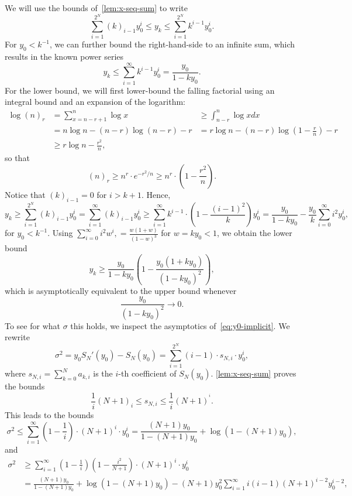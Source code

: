 \documentclass{article}
\begin{document}
\begin{appendixproof}
    We will use the bounds of~\cref{lem:x-seq-sum} to write
    \[
    \sum_{i=1}^{2^N}(k)_{i-1}y_0^i\le y_k\le \sum_{i=1}^{2^N}k^{i-1}y_0^i.
    \]
    For $y_0<k^{-1}$, we can further bound the right-hand-side to an infinite sum, which results in the known power series
    \[
    y_k\le \sum_{i=1}^{\infty}k^{i-1}y_0^i=\frac{y_0}{1-ky_0}.
    \]
    For the lower bound, we will first lower-bound the falling factorial using an integral bound and an expansion of the logarithm:
    \begin{eqnarray*}
    \log(n)_r&=\sum_{x=n-r+1}^n\log x
    &\ge\int_{n-r}^n\log x dx\\
&=n\log n-(n-r)\log(n-r)-r
&=r\log n-(n-r)\log\left(1-\frac rn\right)-r\\
&\ge r\log n-\frac{r^2}{n},
    \end{eqnarray*}
    so that
    \[
    (n)_r\ge n^r\cdot e^{-r^2/n}\ge n^r\cdot\left(1-\frac{r^2}n\right).
    \]
    Notice that $(k)_{i-1}=0$ for $i>k+1$. Hence,
    \[
    y_k\ge \sum_{i=1}^{2^N}(k)_{i-1}y_0^i=\sum_{i=1}^\infty(k)_{i-1}y_0^i\ge \sum_{i=1}^\infty k^{i-1}\cdot\left(1-\frac{(i-1)^2}{k}\right)y_0^i=\frac{y_0}{1-ky_0}-\frac{y_0}{k}\sum_{i=0}^\infty i^2y_0^i,
    \]
    for $y_0<k^{-1}$. Using $\sum_{i=0}^\infty i^2w^i,=\frac{w(1+w)}{(1-w)^3}$ for $w=ky_0<1$, we obtain the lower bound
    \[
    y_k\ge \frac{y_0}{1-ky_0}\left(1-\frac{y_0(1+ky_0)}{(1-ky_0)^2}\right),
    \]
    which is asymptotically equivalent to the upper bound whenever 
    \begin{equation}\label{eq:y_k-condition}
        \frac{y_0}{(1-ky_0)^2}\to0.
    \end{equation}
    To see for what $\sigma$ this holds, we inspect the asymptotics of~\eqref{eq:y0-implicit}. 
    We rewrite
    \[
    \sigma^2=y_0S_N'(y_0)-S_N(y_0)=\sum_{i=1}^{2^N}(i-1)\cdot s_{N,i}\cdot y_0^i,
    \]
    where $s_{N,i}=\sum_{k=0}^Na_{k,i}$ is the $i$-th coefficient of $S_N(y_0).$ \cref{lem:x-seq-sum} proves the bounds
    \[
    \frac1i(N+1)_{i}\le s_{N,i}\le \frac1i(N+1)^{^i}.
    \]
    This leads to the bounds
    \[
    \sigma^2\le \sum_{i=1}^\infty\left(1-\frac1i\right)\cdot (N+1)^i\cdot y_0^i=\frac{(N+1)y_0}{1-(N+1)y_0}+\log(1-(N+1)y_0),
    \]
    and
    \begin{align*}
    \sigma^2
    &\ge \sum_{i=1}^\infty\left(1-\frac1i\right)\left(1-\frac{i^2}{N+1}\right)\cdot (N+1)^i\cdot y_0^i\\
    &=\frac{(N+1)y_0}{1-(N+1)y_0}+\log(1-(N+1)y_0)-(N+1)y_0^2\sum_{i=1}^\infty i(i-1)(N+1)^{i-2} y_0^{i-2},

\end{align*}
\end{appendixproof}
\end{document}
